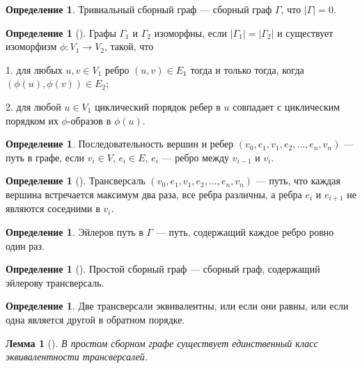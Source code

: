 \documentclass[a4paper,fleqn,12pt,top=0pt]{article}
\theoremstyle{plain}
\newtheorem{lemma}[theorem]{Лемма}
\theoremstyle{definition}
\newtheorem{definition}[theorem]{Определение}
\theoremstyle{remark}
\begin{document}
\begin{definition}
    Тривиальный сборный граф --- сборный граф $\Gamma$, что $|\Gamma| = 0$.
\end{definition}

\begin{definition}[]
    Графы $\Gamma_1$ и $\Gamma_2$ изоморфны, если $|\Gamma_1| = |\Gamma_2|$ и существует изоморфизм $\phi: V_1 \rightarrow V_2$, такой, что 
    
1. для любых $u, v \in V_1$ ребро $(u, v) \in E_1$ тогда и только тогда, когда $(\phi(u), \phi(v)) \in E_2$;

2. для любой $u \in V_1$ циклический порядок ребер в $u$ совпадает с циклическим порядком их $\phi$-образов в $\phi(u)$.
\end{definition}

\begin{definition}
    Последовательность вершин и ребер $(v_0, e_1, v_1, e_2, \dots, e_n, v_n)$ --- путь в графе, если $v_i \in V$, $e_i \in E$, $e_i$ --- ребро между $v_{i - 1}$ и $v_{i}$.
\end{definition}

\begin{definition}[]
    Трансверсаль $(v_0, e_1, v_1, e_2, \dots, e_n, v_n)$ --- путь, что каждая вершина встречается максимум два раза, все ребра различны, а ребра $e_i$ и $e_{i + 1}$ не являются соседними в $v_i$.
\end{definition}

\begin{definition}
    Эйлеров путь в $\Gamma$ --- путь, содержащий каждое ребро ровно один раз.
\end{definition}

\begin{definition}[]
    Простой сборный граф --- сборный граф, содержащий эйлерову трансверсаль.
\end{definition}

\begin{definition}
    Две трансверсали эквивалентны, или если они равны, или если одна является другой в обратном порядке.
\end{definition}

\begin{lemma}[]
    В простом сборном графе существует единственный класс эквивалентности трансверсалей.
\end{lemma}
\end{document}
